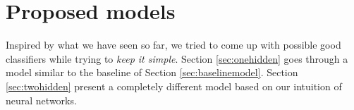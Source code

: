 \begin{table}
\centering
{}
\caption{Precision, recall, f1-score summary table for the baseline model. Support indicates the number of occurrences of each particular class in the true responses (for the test set). Weighted avg is the per metric weighted average where the weights correspond to the support of that class.}
\label{tab:baselineclassificationrep}
\end{table}

\section{Proposed models}
Inspired by what we have seen so far, we tried to come up with possible good classifiers while trying to \textit{keep it simple}. Section \ref{sec:onehidden} goes through a model similar to the baseline of Section \ref{sec:baselinemodel}. Section \ref{sec:twohidden} present a completely different model based on our intuition of neural networks.
